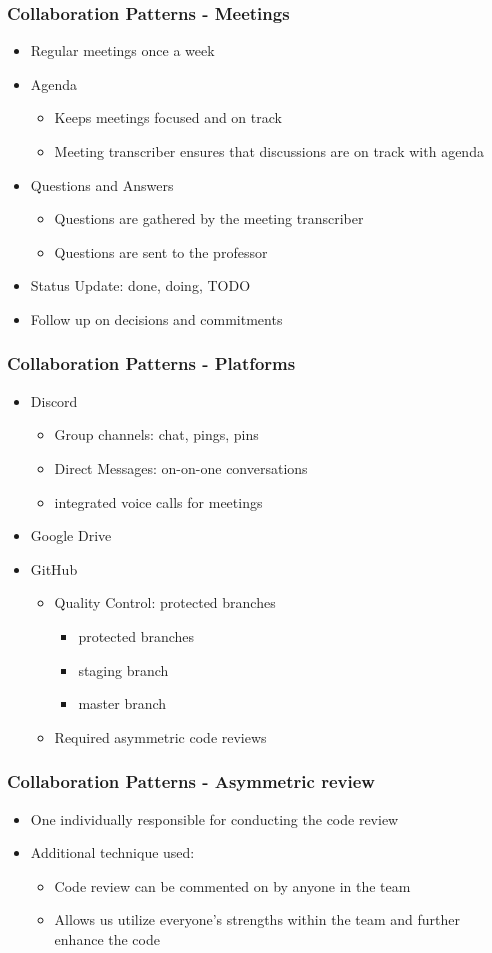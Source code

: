 \documentclass{beamer}
\begin{document}
\begin{frame}
\frametitle{Collaboration Patterns - Meetings}
\begin{itemize}
\item Regular meetings once a week
\item Agenda
\begin{itemize}
\item Keeps meetings focused and on track
\item Meeting transcriber ensures that discussions are on track with agenda
\end{itemize}
\item Questions and Answers
\begin{itemize}
\item Questions are gathered by the meeting transcriber
\item Questions are sent to the professor
\end{itemize}
\item Status Update: done, doing, TODO
\item Follow up on decisions and commitments
\end{itemize}
\end{frame}
\begin{frame}
\frametitle{Collaboration Patterns - Platforms}
\begin{itemize}
\item Discord
\begin{itemize}
\item Group channels: chat, pings, pins
\item Direct Messages: on-on-one conversations
\item integrated voice calls for meetings
\end{itemize}
\item Google Drive
\item GitHub
\begin{itemize}
\item Quality Control: protected branches
\begin{itemize}
\item protected branches
\item staging branch
\item master branch
\end{itemize}
\item Required asymmetric code reviews
\end{itemize}
\end{itemize}
\end{frame}
\begin{frame}
\frametitle{Collaboration Patterns - Asymmetric review}
\begin{itemize}
\item One individually responsible for conducting the code review
\item Additional technique used:
\begin{itemize}
\item Code review can be commented on by anyone in the team
\item Allows us utilize everyone's strengths within the team and further enhance the code
\end{itemize}
\end{itemize}
\end{frame}
\end{document}
